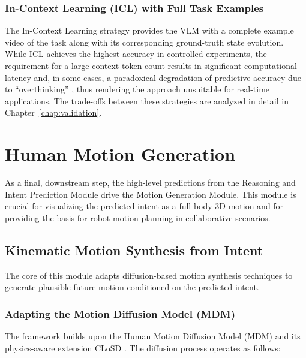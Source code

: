 \subsubsection{In-Context Learning (ICL) with Full Task Examples}

The In-Context Learning strategy provides the VLM with a complete example video of the task along with its corresponding ground-truth state evolution. While ICL achieves the highest accuracy in controlled experiments, the requirement for a large context token count results in significant computational latency and, in some cases, a paradoxical degradation of predictive accuracy due to ``overthinking'' \citep{inversescaling}, thus rendering the approach unsuitable for real-time applications. The trade-offs between these strategies are analyzed in detail in Chapter~\ref{chap:validation}.

\section{Human Motion Generation}
\label{sec:motion_generation}

As a final, downstream step, the high-level predictions from the Reasoning and Intent Prediction Module drive the Motion Generation Module. This module is crucial for visualizing the predicted intent as a full-body 3D motion and for providing the basis for robot motion planning in collaborative scenarios.

\subsection{Kinematic Motion Synthesis from Intent}

The core of this module adapts diffusion-based motion synthesis techniques to generate plausible future motion conditioned on the predicted intent.

\subsubsection{Adapting the Motion Diffusion Model (MDM)}

The framework builds upon the Human Motion Diffusion Model (MDM) \citep{tevet2023human} and its physics-aware extension CLoSD \citep{tevet2024closd}. The diffusion process operates as follows:

